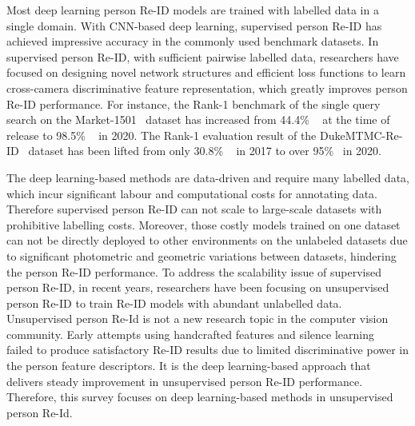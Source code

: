 \documentclass[a4paper,fleqn]{cas-dc}
\begin{document}
Most deep learning person Re-ID models are trained with labelled data in a single domain. With CNN-based deep learning, supervised person Re-ID has achieved impressive accuracy in the commonly used benchmark datasets. In supervised person Re-ID, with sufficient pairwise labelled data, researchers have focused on designing novel network structures and efficient loss functions to learn cross-camera discriminative feature representation, which greatly improves person Re-ID performance. For instance, the Rank-1 benchmark of the single query search on the Market-1501~\cite{zheng_scalable_2015} dataset has increased from 44.4\% ~\cite{zheng_scalable_2015} at the time of release to 98.5\% ~\cite{liu_unity_2020} in 2020. The Rank-1 evaluation result of the DukeMTMC-Re-ID~\cite{zheng_unlabeled_2017} dataset has been lifted from only 30.8\% ~\cite{zheng_unlabeled_2017} in 2017 to over 95\%~\cite{liu_unity_2020} in 2020. 

The deep learning-based methods are data-driven and require many labelled data, which incur significant labour and computational costs for annotating data. Therefore supervised person Re-ID can not scale to large-scale datasets with prohibitive labelling costs. Moreover, those costly models trained on one dataset can not be directly deployed to other environments on the unlabeled datasets due to significant photometric and geometric variations between datasets, hindering the person Re-ID performance. To address the scalability issue of supervised person Re-ID, in recent years, researchers have been focusing on unsupervised person Re-ID to train Re-ID models with abundant unlabelled data. Unsupervised person Re-Id is not a new research topic in the computer vision community. Early attempts using handcrafted features and silence learning ~\cite{wang_unsupervised_2014} failed to produce satisfactory Re-ID results due to limited discriminative power in the person feature descriptors. It is the deep learning-based approach that delivers steady improvement in unsupervised person Re-ID performance. Therefore, this survey focuses on deep learning-based methods in unsupervised person Re-Id.
\end{document}
